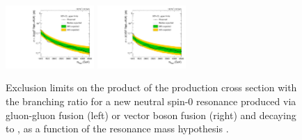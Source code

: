 \begin{figure}[htbp]
  \centering
  \includegraphics[width=0.3\textwidth]{fig/results/limits_RadToWW_o_74.pdf}
  \includegraphics[width=0.3\textwidth]{fig/results/limits_VBFRadToWW_o_74.pdf}
  \caption{
    Exclusion limits on the product of the production cross section with the branching ratio for a new neutral spin-0 resonance produced via gluon-gluon fusion (left) or vector boson fusion (right) and decaying to \WW, as a function of the resonance mass hypothesis \MX.
  }
  \label{fig:exclusion_limits_spin0}
\end{figure}


